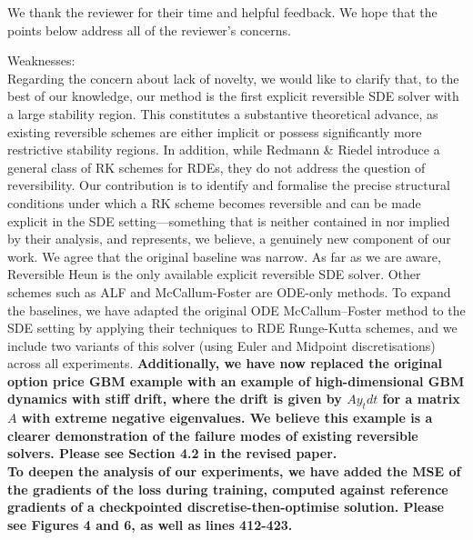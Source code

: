 \documentclass{article}
\newcommand{\NEW}[1]{\color{maroon}\textbf{{#1}}\color{black}}
\begin{document}
We thank the reviewer for their time and helpful feedback. We hope that the points below address all of the reviewer's concerns.

Weaknesses:\\

Regarding the concern about lack of novelty, we would like to clarify that, to the best of our knowledge, our method is the first explicit reversible SDE solver with a large stability region. This constitutes a substantive theoretical advance, as existing reversible schemes are either implicit or possess significantly more restrictive stability regions. In addition, while Redmann \& Riedel introduce a general class of RK schemes for RDEs, they do not address the question of reversibility. Our contribution is to identify and formalise the precise structural conditions under which a RK scheme becomes reversible and can be made explicit in the SDE setting—something that is neither contained in nor implied by their analysis, and represents, we believe, a genuinely new component of our work. We agree that the original baseline was narrow. As far as we are aware, Reversible Heun is the only available explicit reversible SDE solver. Other schemes such as ALF and McCallum-Foster are ODE-only methods. To expand the baselines, we have adapted the original ODE McCallum–Foster method to the SDE setting by applying their techniques to RDE Runge-Kutta schemes, and we include two variants of this solver (using Euler and Midpoint discretisations) across all experiments. \NEW{Additionally, we have now replaced the original option price GBM example with an example of high-dimensional GBM dynamics with stiff drift, where the drift is given by $A y_t dt$ for a matrix $A$ with extreme negative eigenvalues. We believe this example is a clearer demonstration of the failure modes of existing reversible solvers. Please see Section 4.2 in the revised paper.}\\

\NEW{To deepen the analysis of our experiments, we have added the MSE of the gradients of the loss during training, computed against reference gradients of a checkpointed discretise-then-optimise solution. Please see Figures 4 and 6, as well as lines 412-423.}\\
\end{document}
